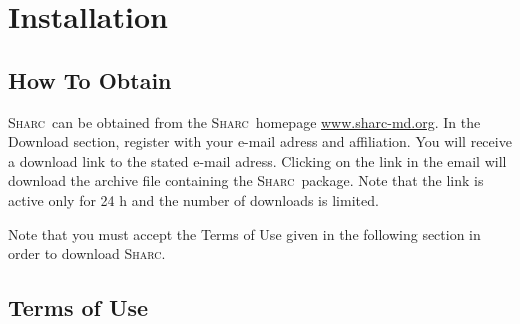 \documentclass[a4paper,11pt,DIV=15,openany,twoside=false]{scrbook}
\newcommand{\sharc}{\textsc{Sharc}}
\begin{document}

\chapter{Installation}

\section{How To Obtain}

\sharc\ can be obtained from the \sharc\ homepage \href{http://sharc-md.org}{www.sharc-md.org}. In the Download section, register with your e-mail adress and affiliation. You will receive a download link to the stated e-mail adress. Clicking on the link in the email will download the archive file containing the \sharc\ package. Note that the link is active only for 24 h and the number of downloads is limited.

Note that you must accept the Terms of Use given in the following section in order to download \sharc.

\section{Terms of Use}
\end{document}
